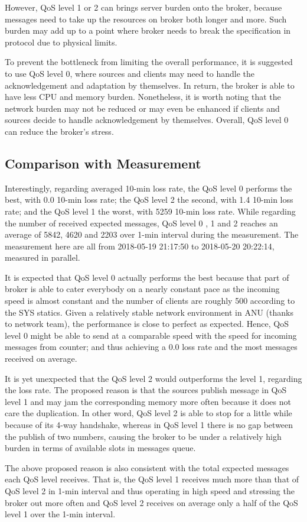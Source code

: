 \documentclass[12pt, letterpaper]{article}
\begin{document}
However, QoS level 1 or 2 can brings server burden onto the broker, because messages need to take up the resources on broker both longer and more. Such burden may add up to a point where broker needs to break the specification in protocol due to physical limits.

To prevent the bottleneck from limiting the overall performance, it is suggested to use QoS level 0, where sources and clients may need to handle the acknowledgement and adaptation by themselves. In return, the broker is able to have less CPU and memory burden. Nonetheless, it is worth noting that the network burden may not be reduced or may even be enhanced if clients and sources decide to handle acknowledgement by themselves. Overall, QoS level 0 can reduce the broker's stress.

\subsection{Comparison with Measurement}

Interestingly, regarding averaged 10-min loss rate, the QoS level 0 performs the best, with 0.0 10-min loss rate; the QoS level 2 the second, with 1.4 10-min loss rate; and the QoS level 1 the worst, with 5259 10-min loss rate. While regarding the number of received expected messages, QoS level 0 , 1 and 2 reaches an average of 5842, 4620 and 2203 over 1-min interval during the measurement. The measurement here are all from 2018-05-19 21:17:50 to 2018-05-20 20:22:14, measured in parallel.

It is expected that QoS level 0 actually performs the best because that part of broker is able to cater everybody on a nearly constant pace as the incoming speed is almost constant and the number of clients are roughly 500 according to the SYS statics. Given a relatively stable network environment in ANU (thanks to network team), the performance is close to perfect as expected. Hence, QoS level 0 might be able to send at a comparable speed with the speed for incoming messages from counter; and thus achieving a 0.0 loss rate and the most messages received on average.

It is yet unexpected that the QoS level 2 would outperforms the level 1, regarding the loss rate. The proposed reason is that the sources publish message in QoS level 1 and may jam the corresponding memory more often because it does not care the duplication. In other word, QoS level 2 is able to stop for a little while because of its 4-way handshake, whereas in QoS level 1 there is no gap between the publish of two numbers, causing the broker to be under a relatively high burden in terms of available slots in messages queue.

The above proposed reason is also consistent with the total expected messages each QoS level receives. That is, the QoS level 1 receives much more than that of QoS level 2 in 1-min interval and thus operating in high speed and stressing the broker out more often and QoS level 2 receives on average only a half of the QoS level 1 over the 1-min interval.
\end{document}
